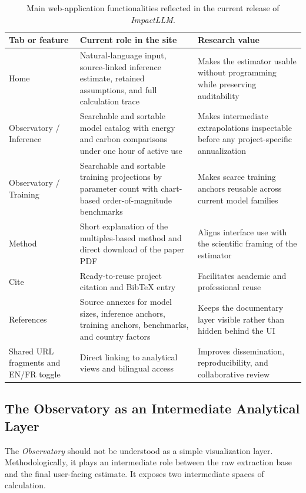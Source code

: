 \documentclass[11pt,a4paper]{article}
\begin{document}
\begin{table}[htbp]
\centering
\small
\begin{tabularx}{\textwidth}{|L{2.4cm}|Y|Y|}
\hline
Tab or feature & Current role in the site & Research value \\
\hline
Home & Natural-language input, source-linked inference estimate, retained assumptions, and full calculation trace & Makes the estimator usable without programming while preserving auditability \\
\hline
Observatory / Inference & Searchable and sortable model catalog with energy and carbon comparisons under one hour of active use & Makes intermediate extrapolations inspectable before any project-specific annualization \\
\hline
Observatory / Training & Searchable and sortable training projections by parameter count with chart-based order-of-magnitude benchmarks & Makes scarce training anchors reusable across current model families \\
\hline
Method & Short explanation of the multiples-based method and direct download of the paper PDF & Aligns interface use with the scientific framing of the estimator \\
\hline
Cite & Ready-to-reuse project citation and BibTeX entry & Facilitates academic and professional reuse \\
\hline
References & Source annexes for model sizes, inference anchors, training anchors, benchmarks, and country factors & Keeps the documentary layer visible rather than hidden behind the UI \\
\hline
Shared URL fragments and EN/FR toggle & Direct linking to analytical views and bilingual access & Improves dissemination, reproducibility, and collaborative review \\
\hline
\end{tabularx}
\caption{Main web-application functionalities reflected in the current release of \emph{ImpactLLM}.}
\label{tab:web-features}
\end{table}

\subsection{The Observatory as an Intermediate Analytical Layer}
The \emph{Observatory} should not be understood as a simple visualization layer. Methodologically, it plays an intermediate role between the raw extraction base and the final user-facing estimate. It exposes two intermediate spaces of calculation.
\end{document}
